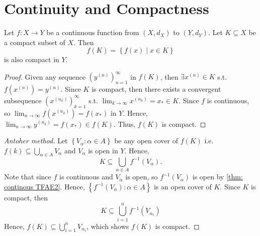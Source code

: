 \section{Continuity and Compactness}
\begin{theorem} \label{thm: continuous func map compact subset to another compact subset}
    Let \(f : X \to Y\) be a continuous function from \((X, d_X)\) to \((Y, d_Y)\). Let \(K \subseteq X\) be a compact subset of \(X\). Then
    \[
        f(K) = \left\{ f(x) \mid x \in K \right\} 
    \] is also compact in \(Y\).     
\end{theorem}
\begin{proof}
    Given any sequence \(\left( y^{(n)} \right)_{n=1}^\infty  \) in \(f(K)\), then \(\exists x^{(n)} \in K\) s.t. \(f \left( x^{(n)} \right) = y^{(n)} \). Since \(K\) is compact, then there exists a convergent subsequence \(\left( x^{(n_k)} \right)_{k=1}^{\infty}  \) s.t. \(\lim_{k \to \infty} x^{(n_k)} = x_{\ast} \in K \). Since \(f\) is continuous, so \(\lim_{n \to \infty} f \left( x^{(n_k)} \right) = f \left( x_{\ast}  \right)   \) in \(Y\). Hence, \(\lim_{n \to \infty} y^{(n_k)} = f(x_{\ast} ) \in f(K)\). Thus, \(f(K)\) is compact. 
\end{proof}
\begin{proof}[Antoher method]
    Let \(\left\{ V_\alpha : \alpha \in A \right\} \) be any open cover of \(f(K)\) i.e. \(f(k) \subseteq \bigcup_{\alpha \in A} V_\alpha  \) and \(V_\alpha \) is open in \(Y\). Hence, 
    \[
        K \subseteq \bigcup_{\alpha \in A} f^{-1}(V_\alpha ).  
    \]  Note that since \(f\) is continuous and \(V_\alpha \) is open, so \(f^{-1}(V_\alpha ) \) is open by \autoref{thm: continous TFAE2}. Hence, \(\left\{ f^{-1}(V_\alpha ) : \alpha \in A \right\} \) is an open cover of \(K\). Since \(K\) is compact, then 
    \[
        K \subseteq \bigcup_{i=1}^n f^{-1}\left( V_{\alpha _i} \right)   
    \] Hence, \(f(K) \subseteq \bigcup_{i=1}^{n} V_{\alpha _i} \), which shows \(f(K)\) is compact.        
\end{proof}